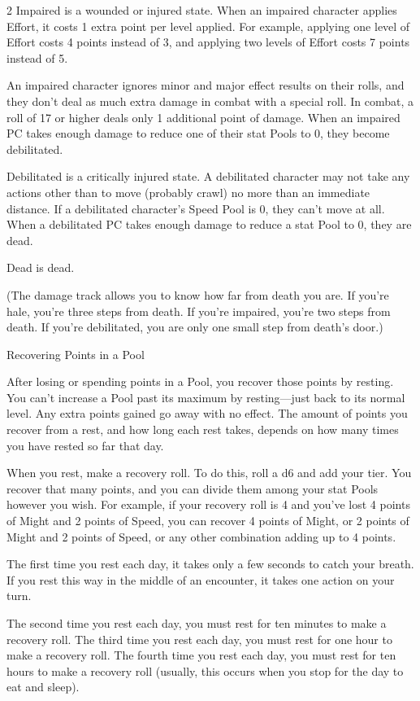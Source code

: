 \begin{multicols}{2}
Impaired is a wounded or injured state. When an impaired character applies Effort, it costs 1 extra point per level applied. For example, applying one level of Effort costs 4 points instead of 3, and applying two levels of Effort costs 7 points instead of 5.

An impaired character ignores minor and major effect results on their rolls, and they don’t deal as much extra damage in combat with a special roll. In combat, a roll of 17 or higher deals only 1 additional point of damage. When an impaired PC takes enough damage to reduce one of their stat Pools to 0, they become debilitated.

Debilitated is a critically injured state. A debilitated character may not take any actions other than to move (probably crawl) no more than an immediate distance. If a debilitated character’s Speed Pool is 0, they can’t move at all. When a debilitated PC takes enough damage to reduce a stat Pool to 0, they are dead.

Dead is dead.

(The damage track allows you to know how far from death you are. If you’re hale, you’re three steps from death. If you’re impaired, you’re two steps from death. If you’re debilitated, you are only one small step from death’s door.)

Recovering Points in a Pool

After losing or spending points in a Pool, you recover those points by resting. You can’t increase a Pool past its maximum by resting—just back to its normal level. Any extra points gained go away with no effect. The amount of points you recover from a rest, and how long each rest takes, depends on how many times you have rested so far that day.

When you rest, make a recovery roll. To do this, roll a d6 and add your tier. You recover that many points, and you can divide them among your stat Pools however you wish. For example, if your recovery roll is 4 and you’ve lost 4 points of Might and 2 points of Speed, you can recover 4 points of Might, or 2 points of Might and 2 points of Speed, or any other combination adding up to 4 points.

The first time you rest each day, it takes only a few seconds to catch your breath. If you rest this way in the middle of an encounter, it takes one action on your turn.

The second time you rest each day, you must rest for ten minutes to make a recovery roll. The third time you rest each day, you must rest for one hour to make a recovery roll. The fourth time you rest each day, you must rest for ten hours to make a recovery roll (usually, this occurs when you stop for the day to eat and sleep).


\end{multicols}
